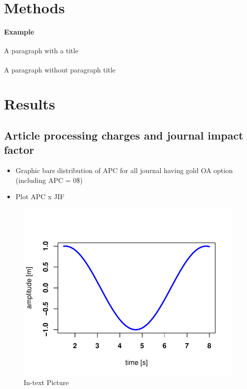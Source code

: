 \documentclass[fleqn,10pt,lineno]{wlpeerj} %
\providecommand{\tightlist}{
\setlength{\itemsep}{0pt}\setlength{\parskip}{0pt}}
\begin{document}
\hypertarget{methods}{%
\section*{Methods}\label{methods}}

\paragraph{Example}

A paragraph with a title

\paragraph{}

A paragraph without paragraph title

\hypertarget{results}{%
\section*{Results}\label{results}}

\hypertarget{article-processing-charges-and-journal-impact-factor}{%
\subsection*{Article processing charges and journal impact factor}\label{article-processing-charges-and-journal-impact-factor}}

\begin{itemize}
\tightlist
\item
  Graphic bars distribution of APC for all journal having gold OA option (including APC = 0\$)
\item
  Plot APC x JIF
\end{itemize}

\begin{figure}
\includegraphics[width=1\linewidth]{OA_Archaeo_files/figure-latex/results-1} \caption{In-text Picture}\label{fig:results}
\end{figure}
\end{document}
